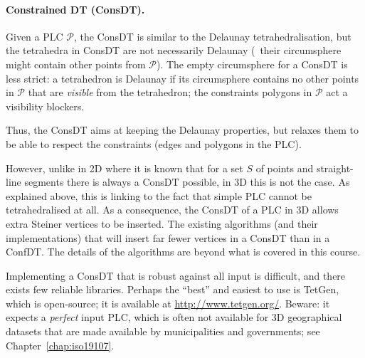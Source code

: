 %
\paragraph*{Constrained DT (ConsDT).}

Given a PLC $\mathcal{P}$, the ConsDT is similar to the Delaunay tetrahedralisation, but the tetrahedra in ConsDT are not necessarily Delaunay (\ie\ their circumsphere might contain other points from $\mathcal{P}$). 
The empty circumsphere for a ConsDT is less strict: a tetrahedron is Delaunay if its circumsphere contains no other points in $\mathcal{P}$ that are \emph{visible} from the tetrahedron; the constraints polygons in $\mathcal{P}$ act a visibility blockers. 

%

Thus, the ConsDT aims at keeping the Delaunay properties, but relaxes them to be able to respect the constraints (edges and polygons in the PLC).

%

However, unlike in 2D where it is known that for a set $S$ of points and straight-line segments there is always a ConsDT possible, in 3D this is not the case.
As explained above, this is linking to the fact that simple PLC cannot be tetrahedralised at all.
As a consequence, the ConsDT of a PLC in 3D allows extra Steiner vertices to be inserted.
The existing algorithms (and their implementations) that will insert far fewer vertices in a ConsDT than in a ConfDT\@. 
The details of the algorithms are beyond what is covered in this course.

%

\newpage
\begin{kaobox}[frametitle=\faCog\ How does it work in practice?]
  Implementing a ConsDT that is robust against all input is difficult, and there exists few reliable libraries.
  Perhaps the ``best'' and easiest to use is TetGen, which is open-source; it is available at \url{http://www.tetgen.org/}.
  Beware: it expects a \emph{perfect} input PLC, which is often not available for 3D geographical datasets that are made available by municipalities and governments; see Chapter~\ref{chap:iso19107}.
\end{kaobox}


